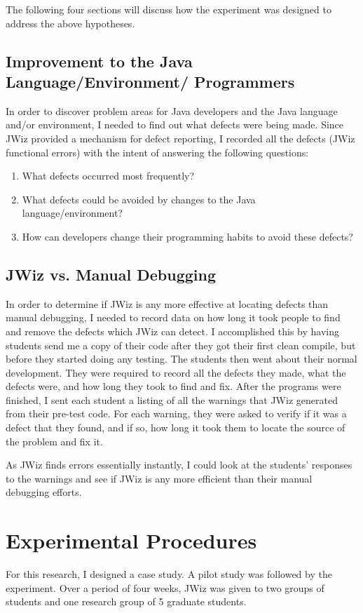 The following four sections will discuss how the experiment was designed to 
address the above hypotheses.

\subsection{Improvement to the Java Language/Environment/ Programmers}
In order to discover problem areas for Java developers and the Java
language and/or environment, I needed to find out what defects were being
made.  Since JWiz provided a mechanism for defect reporting, I recorded all
the defects (JWiz functional errors) with the intent of answering the
following questions:

\begin{enumerate}
\item What defects occurred most frequently?
\item What defects could be avoided by changes to the Java language/environment?
\item How can developers change their programming habits to avoid these
  defects?
\end{enumerate}

\subsection{JWiz vs. Manual Debugging}
In order to determine if JWiz is any more effective at locating defects
than manual debugging, I needed to record data on how long it took people
to find and remove the defects which JWiz can detect.  I accomplished this
by having students send me a copy of their code after they got their first
clean compile, but before they started doing any testing.  The students
then went about their normal development.  They were required to record all
the defects they made, what the defects were, and how long they took to
find and fix.  After the programs were finished, I sent each student a
listing of all the warnings that JWiz generated from their pre-test code.
For each warning, they were asked to verify if it was a defect that they
found, and if so, how long it took them to locate the source of the
problem and fix it.

As JWiz finds errors essentially instantly, I could look at the students'
responses to the warnings and see if JWiz is any more efficient than their
manual debugging efforts.

\section{Experimental Procedures}
For this research, I designed a case study.  A pilot study was followed by
the experiment.  Over a period of four weeks, JWiz was given to two groups
of students and one research group of 5 graduate students.

